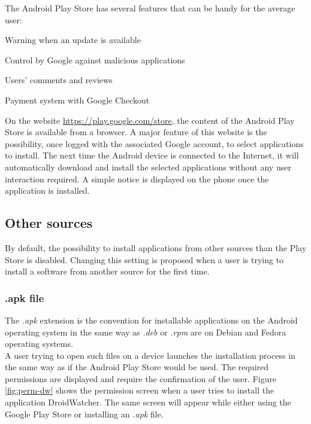 The Android Play Store has several features that can be handy for the average user:
\begin{itemizealt}
\item Warning when an update is available
\item Control by Google against malicious applications
\item Users' comments and reviews
\item Payment system with Google Checkout
\end{itemizealt}

On the website \url{https://play.google.com/store}, the content of the Android Play Store is available from a browser.
A major feature of this website is the possibility, once logged with the associated Google account, to select applications to install.
The next time the Android device is connected to the Internet, it will automatically download and install the selected applications without any user interaction required.
A simple notice is displayed on the phone once the application is installed.\\


\subsection{Other sources}
By default, the possibility to install applications from other sources than the Play Store is disabled.
Changing this setting is proposed when a user is trying to install a software from another source for the first time.

\subsubsection{.apk file}
The \emph{.apk} extension is the convention for installable applications on the Android operating system in the same way as \emph{.deb} or \emph{.rpm} are on Debian and Fedora operating systems.\\

A user trying to open such files on a device launches the installation process in the same way as if the Android Play Store would be used.
The required permissions are displayed and require the confirmation of the user.
Figure \ref{fig:perm-dw} shows the permission screen when a user tries to install the application DroidWatcher.
The same screen will appear while either using the Google Play Store or installing an \emph{.apk} file.\\

